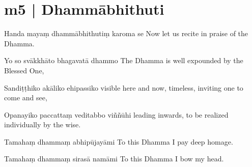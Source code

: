 \section*{m5 | Dhammābhithuti}

\begin{chantsubsection}
  \chantline
    {Handa mayaṃ dhammābhithutiṃ karoma se}
    {Now let us recite in praise of the Dhamma.}

  \chantline
    {Yo so svākkhāto bhagavatā dhammo}
    {The Dhamma is well expounded by the Blessed One,}

  \chantline
    {Sandiṭṭhiko akāliko ehipassiko}
    {visible here and now, timeless, inviting one to come and see,}

  \chantline
    {Opanayiko paccattaṃ veditabbo viññūhi}
    {leading inwards, to be realized individually by the wise.}

  \chantline
    {Tamahaṃ dhammaṃ abhipūjayāmi}
    {To this Dhamma I pay deep homage.}

  \chantline
    {Tamahaṃ dhammaṃ sirasā namāmi}
    {To this Dhamma I bow my head.}

\end{chantsubsection}

